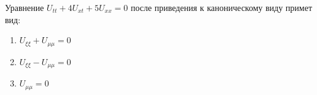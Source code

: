 Уравнение \(U_{tt}+4U_{xt}+5U_{xx}=0\) после приведения к каноническому виду примет вид:

\begin{enumerate}[label=\arabic*)]
    \item \(U_{\xi \xi }+U_{\mu \mu }=0\)
    \item \(U_{\xi \xi }-U_{\mu \mu }=0\)
    \item \(U_{\mu \mu }=0\)
\end{enumerate}

